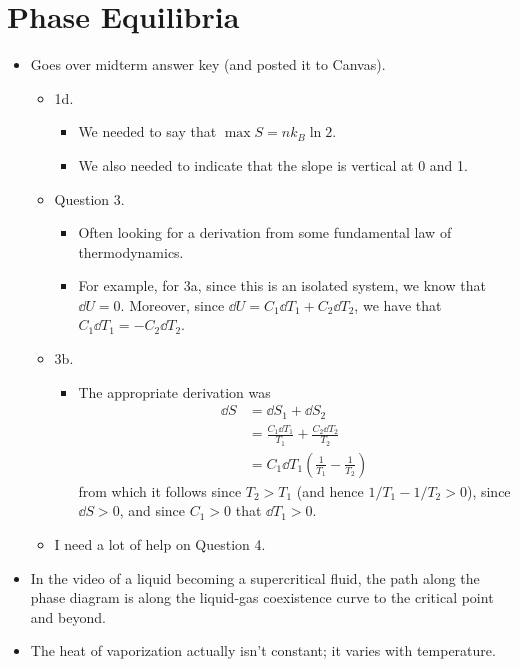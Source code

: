 \documentclass[../notes.tex]{subfiles}
\begin{document}
\section{Phase Equilibria}
\begin{itemize}
    \item {}Goes over midterm answer key (and posted it to Canvas).
    \begin{itemize}
        \item 1d.
        \begin{itemize}
            \item We needed to say that $\max S=nk_B\ln 2$.
            \item We also needed to indicate that the slope is vertical at 0 and 1.
        \end{itemize}
        \item Question 3.
        \begin{itemize}
            \item Often looking for a derivation from some fundamental law of thermodynamics.
            \item For example, for 3a, since this is an isolated system, we know that $\dd{U}=0$. Moreover, since $\dd{U}=C_1\dd{T_1}+C_2\dd{T_2}$, we have that $C_1\dd{T_1}=-C_2\dd{T_2}$.
        \end{itemize}
        \item 3b.
        \begin{itemize}
            \item The appropriate derivation was
            \begin{align*}
                \dd{S} &= \dd{S_1}+\dd{S_2}\\
                &= \frac{C_1\dd{T_1}}{T_1}+\frac{C_2\dd{T_2}}{T_2}\\
                &= C_1\dd{T_1}\left( \frac{1}{T_1}-\frac{1}{T_2} \right)
            \end{align*}
            from which it follows since $T_2>T_1$ (and hence $1/T_1-1/T_2>0$), since $\dd{S}>0$, and since $C_1>0$ that $\dd{T_1}>0$.
        \end{itemize}
        \item I need a lot of help on Question 4.
    \end{itemize}
    \item In the video of a liquid becoming a supercritical fluid, the path along the phase diagram is along the liquid-gas coexistence curve to the critical point and beyond.
    \item The heat of vaporization actually isn't constant; it varies with temperature.

\end{itemize}
\end{document}
